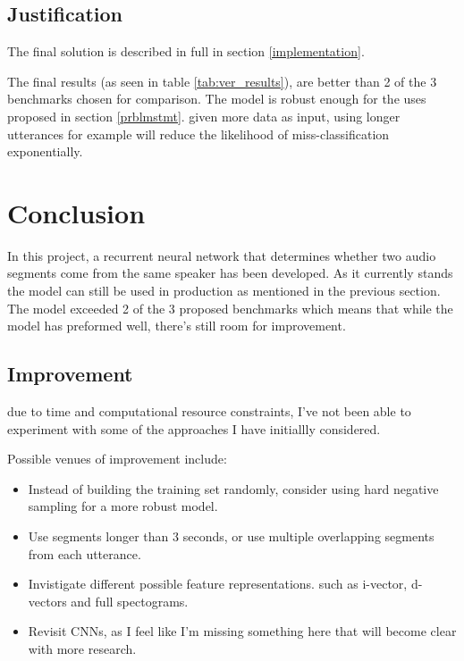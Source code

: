 \documentclass{article}
\begin{document}
\subsection{Justification}

The final solution is described in full in section \ref{implementation}.

The final results (as seen in table \ref{tab:ver_results}), are better than 2 of the 3 benchmarks chosen for comparison. The model is robust enough for the uses proposed in section \ref{prblmstmt}.
given more data as input, using longer utterances for example will reduce the likelihood of miss-classification exponentially.
\section{Conclusion}
In this project, a recurrent neural network that determines whether two audio segments come from the same speaker has been developed.  As it currently stands the model can still be used in production as mentioned in the previous section. The model exceeded 2 of the 3 proposed benchmarks which means that while the model has preformed well, there's still room for improvement.
\subsection{Improvement}
due to time and computational resource constraints, I've not been able to experiment with some of the approaches I have initiallly considered.

Possible venues of improvement include:
\begin{itemize}
    \item Instead of building the training set randomly, consider using hard negative sampling for a more robust model.
    \item Use segments longer than 3 seconds, or use multiple overlapping segments from each utterance.
    \item Invistigate different possible feature representations. such as i-vector, d-vectors and full spectograms.
    \item Revisit CNNs, as I feel like I'm missing something here that will become clear with more research.
\end{itemize}

\pagebreak


\end{document}
